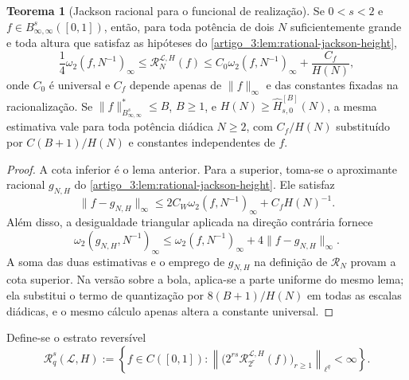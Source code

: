 \documentclass[12pt,a4paper]{article}
\theoremstyle{preciso}
\theoremstyle{definition}
\newcommand{\Library}{\mathcal{L}}
\theoremstyle{preciso}
\newtheorem{theorem}[teorema]{Teorema}
\theoremstyle{preciso}
\theoremstyle{preciso}
\theoremstyle{preciso}
\theoremstyle{definition}
\theoremstyle{preciso}
\theoremstyle{definition}
\theoremstyle{preciso}
\theoremstyle{preciso}
\theoremstyle{definition}
\begin{document}
\begin{theorem}[Jackson racional para o funcional de realização]\label{map:artigo_3:5.12}
\label{artigo_3:thm:regularized-jackson-bernstein}
Se $0<s<2$ e $f\in B^s_{\infty,\infty}([0,1])$, então, para toda potência de
dois $N$ suficientemente grande e toda altura que satisfaz as hipóteses do
\cref{artigo_3:lem:rational-jackson-height},
\begin{equation}
 \frac14\omega_2(f,N^{-1})_\infty
 \le \mathcal R_N^{\Library,H}(f)
 \le C_0\omega_2(f,N^{-1})_\infty+\frac{C_f}{H(N)},
 \label{artigo_3:eq:two-sided-regularized-equivalence}
\end{equation}
onde $C_0$ é universal e $C_f$ depende apenas de $\|f\|_\infty$ e das
constantes fixadas na racionalização.
Se $\|f\|_{B^s_{\infty,\infty}}^*\le B$, $B\ge1$, e
$H(N)\ge\widehat H_{s,0}^{[B]}(N)$, a mesma estimativa vale para toda potência
diádica $N\ge2$, com $C_f/H(N)$ substituído por $C(B+1)/H(N)$ e constantes
independentes de $f$.
\end{theorem}

\begin{proof}
A cota inferior é o lema anterior. Para a superior, toma-se o aproximante
racional $g_{N,H}$ do \cref{artigo_3:lem:rational-jackson-height}. Ele satisfaz
\[
 \|f-g_{N,H}\|_\infty
 \le2C_W\omega_2(f,N^{-1})_\infty+C_fH(N)^{-1}.
\]
Além disso, a desigualdade triangular aplicada na direção contrária fornece
\[
 \omega_2(g_{N,H},N^{-1})_\infty
 \le\omega_2(f,N^{-1})_\infty+4\|f-g_{N,H}\|_\infty.
\]
A soma das duas estimativas e o emprego de $g_{N,H}$ na definição de
$\mathcal R_N$ provam a cota superior. Na versão sobre a bola, aplica-se a parte
uniforme do mesmo lema; ela substitui o termo de quantização por
$8(B+1)/H(N)$ em todas as escalas diádicas, e o mesmo cálculo apenas altera a
constante universal.
\end{proof}

Define-se o estrato reversível
\begin{equation}
 \mathscr R_q^s(\Library,H)
 :=\left\{f\in C([0,1]):
 \left\|\bigl(2^{rs}\mathcal R_{2^r}^{\Library,H}(f)\bigr)_{r\ge1}
 \right\|_{\ell^q}<\infty\right\}.
 \label{artigo_3:eq:reversible-stratum}
\end{equation}
\end{document}
